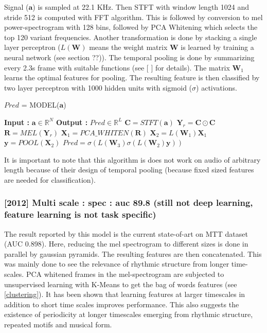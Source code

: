 \noindent Signal ($\textbf{a}$) is sampled at 22.1 KHz. Then STFT with window length 1024 and stride 512 is computed with FFT algorithm. This is followed by conversion to mel power-spectrogram with 128 bins, followed by PCA Whitening which selects the top 120 variant frequencies. Another transformation is done by stacking a single layer perceptron ($L(\textbf{W})$ means the weight matrix $\textbf{W}$ is learned by training a neural network (see section ??)). The temporal pooling is done by summarizing every 2.3s frame with suitable functions (see [ ] for details). The matrix $\textbf{W}_{1}$ learns the optimal features for pooling. The resulting feature is then classified by two layer perceptron with 1000 hidden units with sigmoid ($\sigma$) activations.

\begin{algorithm}
  \caption{$Pred$ = MODEL($\textbf{a}$) }\label{Temporal Pooling}
  \begin{algorithmic}[1]
    \Statex \textbf{Input :} $\textbf{a} \in \mathbb{R}^{N}$
    \Statex \textbf{Output :} $Pred \in \mathbb{R}^{L}$ 
    \State $\textbf{C} = STFT(\textbf{a})$ 
    \State $\textbf{Y}_{r} = \textbf{C} \odot \textbf{C}$ 
    \State $\textbf{R} = MEL(\textbf{Y}_{r})$ 
    \State $\textbf{X}_{1} = PCA\_WHITEN(\textbf{R})$ 
    \State $\textbf{X}_{2} = L(\textbf{W}_{1})\textbf{X}_{1}$  
    \State $\textbf{y} = POOL(\textbf{X}_{2})$ 
    \State $Pred = \sigma(L(\textbf{W}_{3})\sigma(L(\textbf{W}_{2})\textbf{y}))$ 
  \end{algorithmic}
\end{algorithm}
\noindent It is important to note that this algorithm is does not work on audio of arbitrary length because of their design of temporal pooling (because fixed sized features are needed for classification).

\subsubsection{[2012] Multi scale : spec : auc 89.8 (still not deep learning, feature learning is not task specific)}
The result reported by this model is the current state-of-art on MTT dataset (AUC 0.898). Here, reducing the mel spectrogram to different sizes is done in parallel by \gls{gaussian pyramids}. The resulting features are then concatenated. This was mainly done to see the relevance of rhythmic structure from longer time-scales. PCA whitened frames in the mel-spectrogram are subjected to unsupervised learning with K-Means to get the bag of words features (see \ref{clustering}). It has been shown that learning features at larger timescales in addition to short time scales improves performance. This also suggests the existence of periodicity at longer timescales emerging from rhythmic structure, repeated motifs and musical form.  


